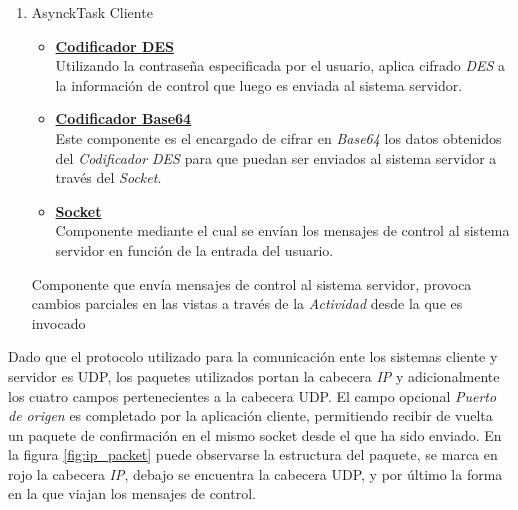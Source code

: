 \documentclass[12pt]{article}
\begin{document}
\begin{enumerate}
\begin{itemize}
                    \end{itemize}
                \item AsynckTask Cliente
                    \begin{itemize}
                        \item \textbf{\underline{Codificador DES}} \\
                            Utilizando la contraseña especificada por el usuario, aplica cifrado \textit{DES} a la información de control que luego es enviada al sistema servidor.
                        \item \textbf{\underline{Codificador Base64}} \\
                            Este componente es el encargado de cifrar en \textit{Base64} los datos obtenidos del \textit{Codificador DES} para que puedan ser enviados al sistema servidor a través del \textit{Socket}.
                        \item \textbf{\underline{Socket}} \\ 
                            Componente mediante el cual se envían los mensajes de control al sistema servidor en función de la entrada del usuario.
                    \end{itemize}
                    Componente que envía mensajes de control al sistema servidor, provoca cambios parciales en las vistas a través de la \textit{Actividad} desde la que es invocado
            \end{enumerate}

            Dado que el protocolo utilizado para la comunicación ente los sistemas cliente y servidor es UDP, los paquetes utilizados portan la cabecera \textit{IP} y adicionalmente los cuatro campos pertenecientes a la cabecera UDP. El campo opcional \textit{Puerto de origen} es completado por la aplicación cliente, permitiendo recibir de vuelta un paquete de confirmación en el mismo socket desde el que ha sido enviado. En la figura \ref{fig:ip_packet} puede observarse la estructura del paquete, se marca en rojo la cabecera \textit{IP}, debajo se encuentra la cabecera UDP, y por último la forma en la que viajan los mensajes de control.
\end{document}
